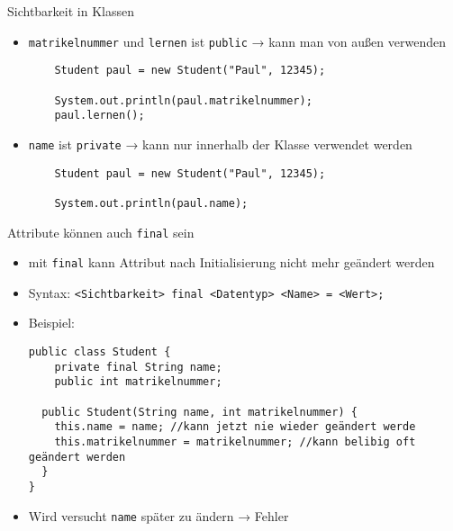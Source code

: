 \documentclass{../../presentation}
\begin{document}
\begin{frame}[fragile]{Sichtbarkeit in Klassen}

	\begin{itemize}

		\item<2-> \texttt{matrikelnummer} und \texttt{lernen} ist \texttt{public} → kann man von außen verwenden
		      \begin{verbatim}
    Student paul = new Student("Paul", 12345);

    System.out.println(paul.matrikelnummer);
    paul.lernen();
  \end{verbatim}
		\item<4-> \texttt{name} ist \texttt{private} → kann nur innerhalb der Klasse verwendet werden
		      \begin{verbatim}
    Student paul = new Student("Paul", 12345);

    System.out.println(paul.name);
  \end{verbatim}
	\end{itemize}
\end{frame}


\begin{frame}[fragile]{Attribute können auch \texttt{final} sein}

	\begin{itemize}
		\item<2-> mit \texttt{final} kann Attribut nach Initialisierung nicht mehr geändert werden
		\item<3-> Syntax: \texttt{<Sichtbarkeit> final <Datentyp> <Name> = <Wert>;}
		\item<4-> Beispiel:
		      \begin{verbatim}
public class Student {
    private final String name;
    public int matrikelnummer;
    
  public Student(String name, int matrikelnummer) {
    this.name = name; //kann jetzt nie wieder geändert werde
    this.matrikelnummer = matrikelnummer; //kann belibig oft geändert werden
  }
}
\end{verbatim}

		\item<5-> Wird versucht \texttt{name} später zu ändern → \alert{Fehler}
	\end{itemize}

\end{frame}
\end{document}

